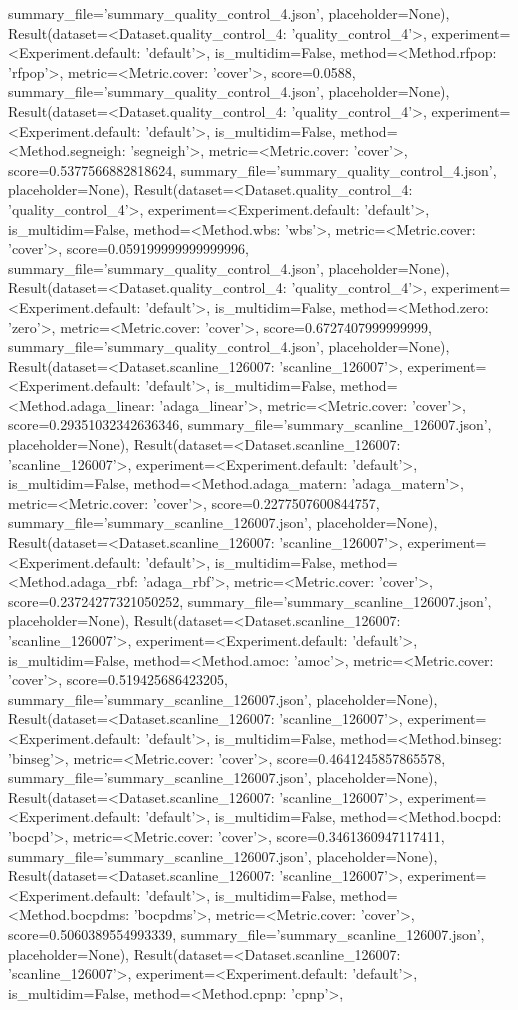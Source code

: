 summary_file='summary_quality_control_4.json', placeholder=None), Result(dataset=<Dataset.quality_control_4: 'quality_control_4'>, experiment=<Experiment.default: 'default'>, is_multidim=False, method=<Method.rfpop: 'rfpop'>, metric=<Metric.cover: 'cover'>, score=0.0588, summary_file='summary_quality_control_4.json', placeholder=None), Result(dataset=<Dataset.quality_control_4: 'quality_control_4'>, experiment=<Experiment.default: 'default'>, is_multidim=False, method=<Method.segneigh: 'segneigh'>, metric=<Metric.cover: 'cover'>, score=0.5377566882818624, summary_file='summary_quality_control_4.json', placeholder=None), Result(dataset=<Dataset.quality_control_4: 'quality_control_4'>, experiment=<Experiment.default: 'default'>, is_multidim=False, method=<Method.wbs: 'wbs'>, metric=<Metric.cover: 'cover'>, score=0.059199999999999996, summary_file='summary_quality_control_4.json', placeholder=None), Result(dataset=<Dataset.quality_control_4: 'quality_control_4'>, experiment=<Experiment.default: 'default'>, is_multidim=False, method=<Method.zero: 'zero'>, metric=<Metric.cover: 'cover'>, score=0.6727407999999999, summary_file='summary_quality_control_4.json', placeholder=None), Result(dataset=<Dataset.scanline_126007: 'scanline_126007'>, experiment=<Experiment.default: 'default'>, is_multidim=False, method=<Method.adaga_linear: 'adaga_linear'>, metric=<Metric.cover: 'cover'>, score=0.29351032342636346, summary_file='summary_scanline_126007.json', placeholder=None), Result(dataset=<Dataset.scanline_126007: 'scanline_126007'>, experiment=<Experiment.default: 'default'>, is_multidim=False, method=<Method.adaga_matern: 'adaga_matern'>, metric=<Metric.cover: 'cover'>, score=0.2277507600844757, summary_file='summary_scanline_126007.json', placeholder=None), Result(dataset=<Dataset.scanline_126007: 'scanline_126007'>, experiment=<Experiment.default: 'default'>, is_multidim=False, method=<Method.adaga_rbf: 'adaga_rbf'>, metric=<Metric.cover: 'cover'>, score=0.23724277321050252, summary_file='summary_scanline_126007.json', placeholder=None), Result(dataset=<Dataset.scanline_126007: 'scanline_126007'>, experiment=<Experiment.default: 'default'>, is_multidim=False, method=<Method.amoc: 'amoc'>, metric=<Metric.cover: 'cover'>, score=0.519425686423205, summary_file='summary_scanline_126007.json', placeholder=None), Result(dataset=<Dataset.scanline_126007: 'scanline_126007'>, experiment=<Experiment.default: 'default'>, is_multidim=False, method=<Method.binseg: 'binseg'>, metric=<Metric.cover: 'cover'>, score=0.4641245857865578, summary_file='summary_scanline_126007.json', placeholder=None), Result(dataset=<Dataset.scanline_126007: 'scanline_126007'>, experiment=<Experiment.default: 'default'>, is_multidim=False, method=<Method.bocpd: 'bocpd'>, metric=<Metric.cover: 'cover'>, score=0.3461360947117411, summary_file='summary_scanline_126007.json', placeholder=None), Result(dataset=<Dataset.scanline_126007: 'scanline_126007'>, experiment=<Experiment.default: 'default'>, is_multidim=False, method=<Method.bocpdms: 'bocpdms'>, metric=<Metric.cover: 'cover'>, score=0.5060389554993339, summary_file='summary_scanline_126007.json', placeholder=None), Result(dataset=<Dataset.scanline_126007: 'scanline_126007'>, experiment=<Experiment.default: 'default'>, is_multidim=False, method=<Method.cpnp: 'cpnp'>, 